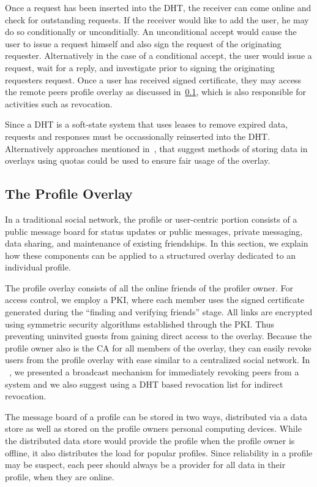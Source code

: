 \documentclass[letterpaper,twocolumn,10pt]{article}
\begin{document}
Once a request has been inserted into the DHT, the receiver can come online and
check for outstanding requests.  If the receiver would like to add the user, he
may do so conditionally or unconditially.  An unconditional accept would cause
the user to issue a request himself and also sign the request of the originating
requester.  Alternatively in the case of a conditional accept, the user would
issue a request, wait for a reply, and investigate prior to signing the originating
requesters request.  Once a user has received signed certificate, they may access
the remote peers profile overlay as discussed in~\ref{profile_overlay}, which is
also responsible for activities such as revocation.

Since a DHT is a soft-state system that uses leases to remove expired data, requests
and responses must be occassionally reinserted into the DHT.  Alternatively
approaches mentioned in~\cite{}, that suggest methods of storing data in overlays
using quotas could be used to ensure fair usage of the overlay.

\subsection{The Profile Overlay}
\label{profile_overlay}
In a traditional social network, the profile or user-centric portion consists
of a public message board for status updates or public messages, private
messaging, data sharing, and maintenance of existing friendships.  In this
section, we explain how these components can be applied to a structured overlay
dedicated to an individual profile.

The profile overlay consists of all the online friends of the profiler owner.
For access control, we employ a PKI, where each member uses the signed certificate
generated during the ``finding and verifying friends'' stage.  All links are
encrypted using symmetric security algorithms established through the PKI.
Thus preventing uninvited guests from gaining direct access to the overlay.
Because the profile owner also is the CA for all members of the overlay, they
can easily revoke users from the profile overlay with ease similar to a
centralized social network.  In ~\cite{icdcs}, we presented a broadcast mechanism
for immediately revoking peers from a system and we also suggest using a DHT based
revocation list for indirect revocation.

The message board of a profile can be stored in two ways, distributed via a
data store as well as stored on the profile owners personal computing devices.
While the distributed data store would provide the profile when the profile
owner is offline, it also distributes the load for popular profiles.  Since
reliability in a profile may be suspect, each peer should always be a provider
for all data in their profile, when they are online.
\end{document}
